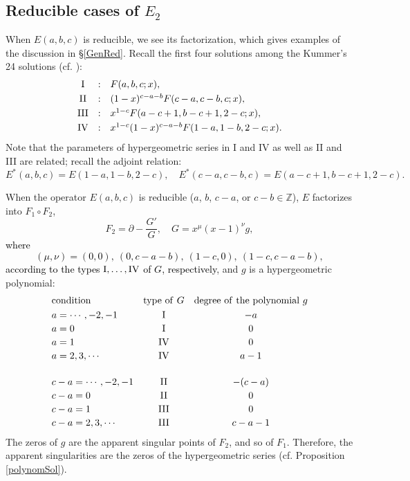 \documentclass[a4paper,12pt]{article}
\theoremstyle{definition}
\theoremstyle{remark}
\numberwithin{equation}{section} %
\newcommand{\blue}[1]{\textcolor{black}{#1}}
\begin{document}
\subsection{Reducible cases of $E_2$}\label{E2Fact}
When $E(a,b,c)$ is reducible, we see its factorization,
which gives examples of the discussion in \S \ref{GenRed}. %
Recall the first four solutions among
the Kummer's 24 solutions (cf. \cite{Er}):
   $$\begin{array}{ccl}
  {\rm I}&:&F(a,b,c;x),\\[3pt]
  {\rm II}&:&(1-x)^{c-a-b}F(c-a,c-b,c;x),\\[3pt]
  {\rm III}&:&x^{1-c}F(a-c+1,b-c+1,2-c;x),\\[3pt]
  {\rm IV}&:&x^{1-c}(1-x)^{c-a-b}F(1-a,1-b,2-c;x).
\end{array}$$
Note that the parameters of hypergeometric series in I and IV
as well as II and III are related; recall the adjoint relation:
$$  E^*(a,b,c)=E(1-a,1-b,2-c),\quad E^*(c-a,c-b,c)=E(a-c+1,b-c+1,2-c).$$

When the operator $E(a,b,c)$ is
reducible ($a$, $b$, $c-a$, or $c-b\in \mathbb{Z} $), 
$E$ factorizes into $F_1\circ F_2$,
$$F_2=\partial-\frac{G'}G, \quad G=x^\mu(x-1)^{\nu}g,$$
\blue{where
  $$(\mu,\nu)=(0,0),\ (0,c-a-b),\ (1-c,0),\ (1-c,c-a-b),$$
  according to the types ${\rm I},\dots,{\rm IV}$ of $G$, respectively},
and $g$ is a hypergeometric polynomial:
  $$\begin{array}{lcc}
 {\rm condition}& {\rm type\ of\ }G&{\rm degree\ of\ the\ polynomial\ }g\\[3pt]
    a=\cdots,-2,-1& {\rm I}& -a\\[2pt]
  a=0& {\rm I}&0\\[2pt]
  a=1& {\rm IV}&0\\[2pt]
  a=2,3,\cdots&{\rm IV}&a-1\\ [3pt]
  &&\\%
  c-a=\cdots,-2,-1& {\rm II}&-(c-a)\\[2pt]
  c-a=0& {\rm II}&0\\[2pt]
  c-a=1& {\rm III}&0\\[2pt]
  c-a=2,3,\cdots&{\rm III}&c-a-1
 \end{array}$$
The zeros of $g$ are the apparent singular points of $F_2$, and so of $F_1$. 
Therefore, the apparent singularities are the zeros of
the hypergeometric series (cf. Proposition \ref{polynomSol}).
\end{document}
